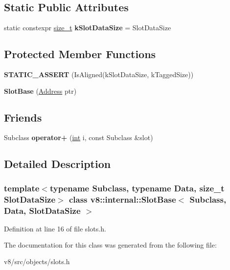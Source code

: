 \subsection*{Static Public Attributes}
\begin{DoxyCompactItemize}
\item 
\mbox{\label{classv8_1_1internal_1_1SlotBase_a9f8a9ea0179c8bb1022d42e573836435}} 
static constexpr \mbox{\hyperlink{classsize__t}{size\+\_\+t}} {\bfseries k\+Slot\+Data\+Size} = Slot\+Data\+Size
\end{DoxyCompactItemize}
\subsection*{Protected Member Functions}
\begin{DoxyCompactItemize}
\item 
\mbox{\label{classv8_1_1internal_1_1SlotBase_ae272e89658b2da4e92904f323a85ba41}} 
{\bfseries S\+T\+A\+T\+I\+C\+\_\+\+A\+S\+S\+E\+RT} (Is\+Aligned(k\+Slot\+Data\+Size, k\+Tagged\+Size))
\item 
\mbox{\label{classv8_1_1internal_1_1SlotBase_ae8fdace82400ba35c79a04fa6632b1a2}} 
{\bfseries Slot\+Base} (\mbox{\hyperlink{classuintptr__t}{Address}} ptr)
\end{DoxyCompactItemize}
\subsection*{Friends}
\begin{DoxyCompactItemize}
\item 
\mbox{\label{classv8_1_1internal_1_1SlotBase_a79a4abdb7bf81110a629b3427163adf0}} 
Subclass {\bfseries operator+} (\mbox{\hyperlink{classint}{int}} i, const Subclass \&slot)
\end{DoxyCompactItemize}


\subsection{Detailed Description}
\subsubsection*{template$<$typename Subclass, typename Data, size\+\_\+t Slot\+Data\+Size$>$\newline
class v8\+::internal\+::\+Slot\+Base$<$ Subclass, Data, Slot\+Data\+Size $>$}



Definition at line 16 of file slots.\+h.



The documentation for this class was generated from the following file\+:\begin{DoxyCompactItemize}
\item 
v8/src/objects/slots.\+h\end{DoxyCompactItemize}
